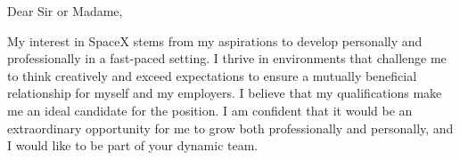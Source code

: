 \documentclass[10pt]{article}
\begin{document}
\bigskip %
Dear Sir or Madame,

\bigskip %
My interest in SpaceX stems from my aspirations to develop personally  and  professionally in a fast-paced setting. I thrive in environments that challenge me to think creatively and exceed expectations to ensure a mutually beneficial relationship for myself and my employers.
I believe that my qualifications make me an ideal candidate for the position. I am confident that it would be an extraordinary opportunity for me to grow both professionally and personally, and I would like to be part of your dynamic team.
\end{document}
